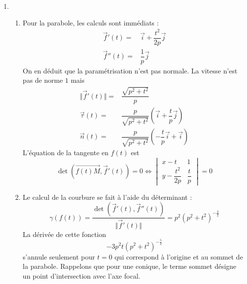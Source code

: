 \begin{enumerate}
\item 
\begin{enumerate}
 \item Pour la parabole, les calculs sont immédiats :
\begin{align*}
 \overrightarrow f'(t)=& \overrightarrow i + \dfrac{t^2}{2p}\overrightarrow j \\
\overrightarrow f''(t)=&  \dfrac{1}{p}\overrightarrow j 
\end{align*}
On en déduit que la paramétrisation n'est pas normale. La vitesse n'est pas de norme $1$ mais
\begin{align*}
 \Vert  \overrightarrow f'(t)\Vert =& \dfrac{\sqrt{p^2+t^2}}{p}\\
\overrightarrow{\tau}(t) =& \dfrac{p}{\sqrt{p^2+t^2}}\left( \overrightarrow i + \dfrac{t}{p}\overrightarrow j\right) \\
\overrightarrow{n} (t) =& \dfrac{p}{\sqrt{p^2+t^2}}\left(- \dfrac{t}{p}\overrightarrow i+ \overrightarrow i\right) 
\end{align*}
L'équation de la tangente en $f(t)$ est
\begin{displaymath}
 \det(\overrightarrow{f(t)M},\overrightarrow f'(t))=0
\Leftrightarrow
\begin{vmatrix}
 x-t & 1 \\
y-\dfrac{t^2}{2p} & \dfrac{t}{p} 
\end{vmatrix}
=0
\end{displaymath}

\item Le calcul de la courbure se fait à l'aide du déterminant :
\begin{displaymath}
 \gamma(f(t))=
\dfrac{\det(\overrightarrow f'(t),\overrightarrow f''(t))}{\Vert \overrightarrow f'(t)\Vert}
=p^2(p^2+t^2)^{-\frac{3}{2}}
\end{displaymath}
La dérivée de cette fonction
\begin{displaymath}
 -3p^2t(p^2+t^2)^{-\frac{5}{2}}
\end{displaymath}
s'annule seulement pour $t=0$ qui correspond à l'origine et au sommet de la parabole.\newline
Rappelons que pour une conique, le terme sommet désigne un point d'intersection avec l'axe focal.
\end{enumerate}


\end{enumerate}
